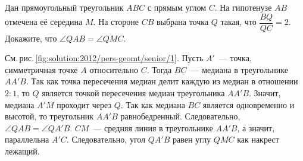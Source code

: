\problem
Дан прямоугольный треугольник $ABC$ с прямым углом $C$.
На гипотенузе $AB$ отмечена её середина $M$.
На стороне $CB$ выбрана точка $Q$ такая, что $\dfrac{BQ}{QC} = 2$.
Докажите, что $\angle QAB = \angle QMC$.

%
\label{solution:2012/pers-geomt/senior/1}%
См.\,рис.\,\ref{fig:solution:2012/pers-geomt/senior/1}.
Пусть $A'$~--- точка, симметричная точке $A$ относительно $C$.
Тогда $BC$~--- медиана в треугольнике $AA'B$.
Так как точка пересечения медиан делит каждую из медиан в отношении $2 : 1$,
то $Q$ является точкой пересечения медиан треугольника $AA'B$.
Значит, медиана $A'M$ проходит через $Q$.
Так как медиана $BC$ является одновременно и высотой, то треугольник $AA'B$
равнобедренный.
Следовательно, $\angle QAB = \angle QA'B$.
$CM$~--- средняя линия в треугольнике $AA'B$, а значит, параллельна $A'C$.
Следовательно, угол $QA'B$ равен углу $QMC$ как накрест лежащий.

\endproblem
